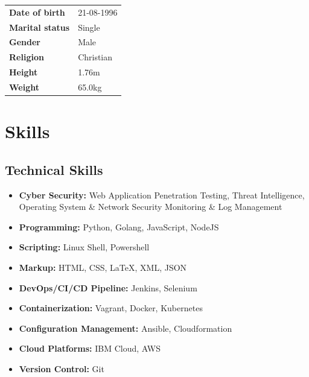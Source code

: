 \documentclass[11pt,a4paper]{moderncv}
\begin{document}
\begin{tabular}{p{4cm}l}
\textbf{Date of birth}         &   21-08-1996 \\ 
\textbf{Marital status}        &   Single    \\ 
\textbf{Gender}                &   Male \\
\textbf{Religion}             &    Christian\\
\textbf{Height}     &    1.76m \\ 
\textbf{Weight}     &    65.0kg \\ 

\end{tabular}

\section{Skills}

\subsection{\textbf{Technical Skills}}

\begin{itemize}
	
	\item \textbf{Cyber Security:} Web Application Penetration Testing, Threat Intelligence, Operating System \& Network Security Monitoring \& Log Management
	
	\item \textbf{Programming:} Python, Golang, JavaScript, NodeJS
	
	\item \textbf{Scripting:} Linux Shell, Powershell
	
	\item \textbf{Markup:} HTML, CSS, {\LaTeX}, XML, JSON
	
	\item \textbf{DevOps/CI/CD Pipeline:} Jenkins, Selenium
	
	\item \textbf{Containerization:} Vagrant, Docker, Kubernetes
	
	\item \textbf{Configuration Management:} Ansible, Cloudformation

	\item \textbf{Cloud Platforms:} IBM Cloud, AWS

	\item \textbf{Version Control:} Git

\end{itemize}
	
\end{document}
